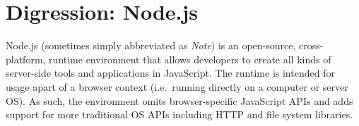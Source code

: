 \documentclass[a4paper, justified, notoc]{tufte-handout} %
\begin{document}
\newpage
\section{Digression: Node.js} %
\label{sec:node_js}

Node.js (sometimes simply abbreviated as \emph{Note}) is an open-source, cross-platform, runtime environment that allows developers to create all kinds of server-side tools and applications in JavaScript. The runtime is intended for usage apart of a browser context (i.e.\ running directly on a computer or server OS). As such, the environment omits browser-specific JavaScript APIs and adds support for more traditional OS APIs including HTTP and file system libraries.
\end{document}
